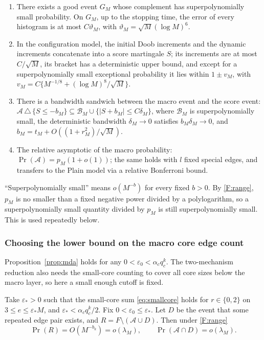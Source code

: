 \begin{enumerate}[label=(C\arabic*)]
\item There exists a good event $G_M$ whose complement has superpolynomially small probability. On
$G_M$, up to the stopping time, the error of every histogram is at most $C\vartheta_M$, with
$\vartheta_M=\sqrt M(\log M)^6$.
\item In the configuration model, the initial Doob increments and the dynamic increments
concatenate into a score martingale $S$; its increments are at most $C/\sqrt M$, its bracket has a
deterministic upper bound, and except for a superpolynomially small exceptional probability it
lies within $1\pm v_M$, with $v_M=C\{M^{-1/8}+(\log M)^8/\sqrt M\}$.
\item There is a bandwidth sandwich between the macro event and the score event:
$\mathcal A\,\triangle\,\{S\le-b_M\}\subseteq\mathcal B_M\cup\{|S+b_M|\le C\delta_M\}$, where
$\mathcal B_M$ is superpolynomially small, the deterministic bandwidth $\delta_M\to0$ satisfies
$b_M\delta_M\to0$, and $b_M=t_M+O((1+r_M^2)/\sqrt M)$.
\item The relative asymptotic of the macro probability: $\Pr(\mathcal A)=p_M(1+o(1))$; the same
holds with $l$ fixed special edges, and transfers to the Plain model via a relative Bonferroni
bound.
\end{enumerate}

``Superpolynomially small'' means $o(M^{-b})$ for every fixed $b>0$. By \eqref{F:range}, $p_M$ is
no smaller than a fixed negative power divided by a polylogarithm, so a superpolynomially small
quantity divided by $p_M$ is still superpolynomially small. This is used repeatedly below.

\subsubsection{Choosing the lower bound on the macro core edge count}

Proposition~\ref{prop:mda} holds for any $0<\varepsilon_0<\alpha_cq_c^k$. The two-mechanism
reduction also needs the small-core counting to cover all core sizes below the macro layer, so
here a small enough cutoff is fixed.

\begin{lemma}\label{F:lem:cutoff}
Take $\varepsilon_*>0$ such that the small-core sum \eqref{eq:smallcore} holds for
$r\in\{0,2\}$ on $3\le e\le\varepsilon_*M$, and $\varepsilon_*<\alpha_cq_c^k/2$. Fix
$0<\varepsilon_0\le\varepsilon_*$. Let $D$ be the event that some repeated edge pair exists, and
$R=F\setminus(\mathcal A\cup D)$. Then under \eqref{F:range}
\begin{equation*}
\Pr(R)=O(M^{-b_k})=o(\lambda_M),\qquad \Pr(\mathcal A\cap D)=o(\lambda_M).
\end{equation*}
\end{lemma}


